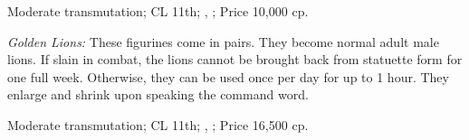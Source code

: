 Moderate transmutation; CL 11th; , ; Price 10,000 cp.

\textit{Golden Lions:} These figurines come in pairs. They become normal adult male lions. If slain in combat, the lions cannot be brought back from statuette form for one full week. Otherwise, they can be used once per day for up to 1 hour. They enlarge and shrink upon speaking the command word.

Moderate transmutation; CL 11th; , ; Price 16,500 cp.





